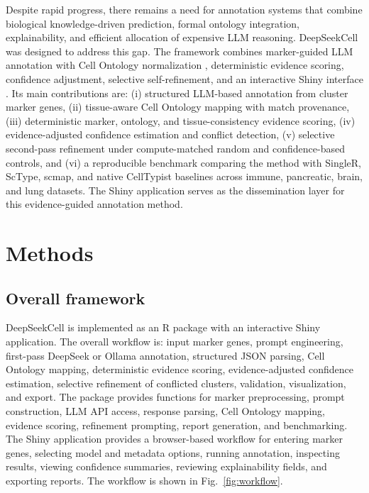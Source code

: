 \documentclass[referee,lineno,pdflatex]{sn-jnl}
\begin{document}
Despite rapid progress, there remains a need for annotation systems that combine biological knowledge-driven prediction, formal ontology integration, explainability, and efficient allocation of expensive LLM reasoning. DeepSeekCell was designed to address this gap. The framework combines marker-guided LLM annotation with Cell Ontology normalization \cite{cellontology,tan2025cellontology}, deterministic evidence scoring, confidence adjustment, selective self-refinement, and an interactive Shiny interface \cite{shiny}. Its main contributions are: (i) structured LLM-based annotation from cluster marker genes, (ii) tissue-aware Cell Ontology mapping with match provenance, (iii) deterministic marker, ontology, and tissue-consistency evidence scoring, (iv) evidence-adjusted confidence estimation and conflict detection, (v) selective second-pass refinement under compute-matched random and confidence-based controls, and (vi) a reproducible benchmark comparing the method with SingleR, ScType, scmap, and native CellTypist baselines across immune, pancreatic, brain, and lung datasets. The Shiny application serves as the dissemination layer for this evidence-guided annotation method.

\section{Methods}\label{sec:methods}

\subsection{Overall framework}

DeepSeekCell is implemented as an R package with an interactive Shiny application. The overall workflow is: input marker genes, prompt engineering, first-pass DeepSeek or Ollama annotation, structured JSON parsing, Cell Ontology mapping, deterministic evidence scoring, evidence-adjusted confidence estimation, selective refinement of conflicted clusters, validation, visualization, and export. The package provides functions for marker preprocessing, prompt construction, LLM API access, response parsing, Cell Ontology mapping, evidence scoring, refinement prompting, report generation, and benchmarking. The Shiny application provides a browser-based workflow for entering marker genes, selecting model and metadata options, running annotation, inspecting results, viewing confidence summaries, reviewing explainability fields, and exporting reports. The workflow is shown in Fig.~\ref{fig:workflow}.
\end{document}
